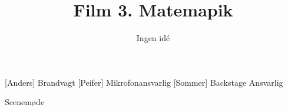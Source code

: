 \documentclass[a4paper,11pt]{article}
\title{Film 3. Matemapik}
\author{Ingen idé }
\begin{document}
\maketitle

\begin{roles}
[Anders] Brandvagt
[Peifer] Mikrofonansvarlig
[Sommer] Backstage Ansvarlig
\end{roles}

\begin{song}
Scenemøde
\end{song}
\end{document}

